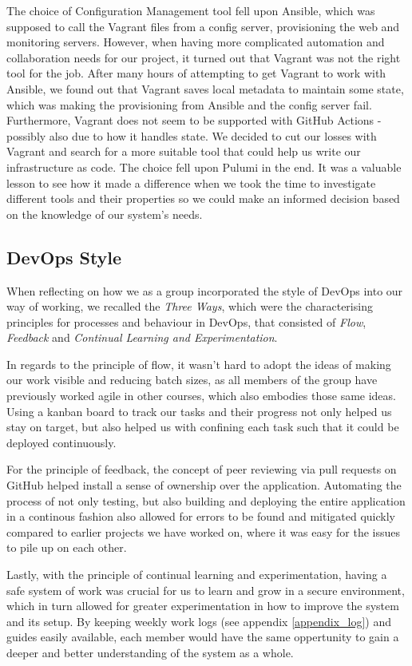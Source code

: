 The choice of Configuration Management tool fell upon Ansible, which was supposed to call the Vagrant files from a config server, provisioning the web and monitoring servers.
However, when having more complicated automation and collaboration needs for our project, it turned out that Vagrant was not the right tool for the job.
After many hours of attempting to get Vagrant to work with Ansible, we found out that Vagrant saves local metadata to maintain some state, which was making the provisioning from Ansible and the config server fail\cite{issue178-vagrant-ansible}. Furthermore, Vagrant does not seem to be supported with GitHub Actions - possibly also due to how it handles state.
We decided to cut our losses with Vagrant and search for a more suitable tool that could help us write our infrastructure as code.
The choice fell upon Pulumi in the end.
It was a valuable lesson to see how it made a difference when we took the time to investigate different tools and their properties so we could make an informed decision based on the knowledge of our system's needs.

\subsection{DevOps Style}
When reflecting on how we as a group incorporated the style of DevOps into our way of working, we recalled the \textit{Three Ways}, which were the characterising principles for processes and behaviour in DevOps, that consisted of \textit{Flow}, \textit{Feedback} and \textit{Continual Learning and Experimentation}\cite{devopshandbook}.

In regards to the principle of flow, it wasn't hard to adopt the ideas of making our work visible and reducing batch sizes, as all members of the group have previously worked agile in other courses, which also embodies those same ideas. Using a kanban board to track our tasks and their progress not only helped us stay on target, but also helped us with confining each task such that it could be deployed continuously\cite{devopshandbook}.

For the principle of feedback, the concept of peer reviewing via pull requests on GitHub helped install a sense of ownership over the application. Automating the process of not only testing, but also building and deploying the entire application in a continous fashion also allowed for errors to be found and mitigated quickly compared to earlier projects we have worked on, where it was easy for the issues to pile up on each other.

Lastly, with the principle of continual learning and experimentation, having a safe system of work\cite{devopshandbook} was crucial for us to learn and grow in a secure environment, which in turn allowed for greater experimentation in how to improve the system and its setup. By keeping weekly work logs (see appendix \ref{appendix_log}) and guides easily available, each member would have the same oppertunity to gain a deeper and better understanding of the system as a whole.
